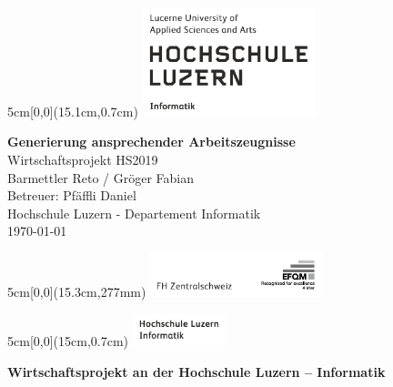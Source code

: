 \begin{titlepage}
	\begin{textblock*}{5cm}[0,0](15.1cm,0.7cm)
		\includegraphics[keepaspectratio,width=5cm]{img/HSLU_Logo}
	\end{textblock*}
	\begin{center}
		\vspace*{5cm}
		\Huge{\textbf{Generierung ansprechender Arbeitszeugnisse}} \\
		\vspace{0.5em}
		\Large{Wirtschaftsprojekt HS2019}\\
		\vspace{3em}
		\LARGE{Barmettler Reto / Gröger Fabian}\\
		\vspace{1em}
		\Large{Betreuer: Pfäffli Daniel}\\
		\vfill
		\large{Hochschule Luzern - Departement Informatik}\\
		\large{\today}\\
	\end{center}
	\begin{textblock*}{5cm}[0,0](15.3cm,277mm)
		\includegraphics[keepaspectratio,width=5cm]{img/FHZ_Logo}
	\end{textblock*}
\end{titlepage}

\newpage


\begin{textblock*}{5cm}[0,0](15cm,0.7cm)
	\includegraphics[keepaspectratio,width=2.7cm]{img/HSLU_Logo_Header}
\end{textblock*}

\vspace{0.6cm}
\noindent
\textbf{\Large{Wirtschaftsprojekt an der Hochschule Luzern – Informatik}}

